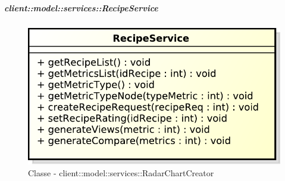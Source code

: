 		\subparagraph{client::model::services::RecipeService} %
		\label{subp:client_model_services_recipeservice}
		\begin{figure}[htbp]
				\centering
				\centerline{\includegraphics[scale=0.7]{./images/client/classes/model/recipe_service.pdf}}
				\caption{Classe - client::model::services::RadarChartCreator}
			\end{figure}
